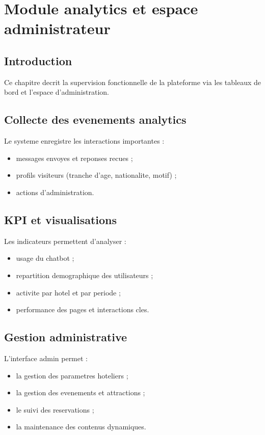 \chapter{Module analytics et espace administrateur}

\section{Introduction}
Ce chapitre decrit la supervision fonctionnelle de la plateforme via les tableaux de bord et l'espace d'administration.

\section{Collecte des evenements analytics}
Le systeme enregistre les interactions importantes :
\begin{itemize}
  \item messages envoyes et reponses recues ;
  \item profils visiteurs (tranche d'age, nationalite, motif) ;
  \item actions d'administration.
\end{itemize}

\section{KPI et visualisations}
Les indicateurs permettent d'analyser :
\begin{itemize}
  \item usage du chatbot ;
  \item repartition demographique des utilisateurs ;
  \item activite par hotel et par periode ;
  \item performance des pages et interactions cles.
\end{itemize}

\section{Gestion administrative}
L'interface admin permet :
\begin{itemize}
  \item la gestion des parametres hoteliers ;
  \item la gestion des evenements et attractions ;
  \item le suivi des reservations ;
  \item la maintenance des contenus dynamiques.
\end{itemize}

